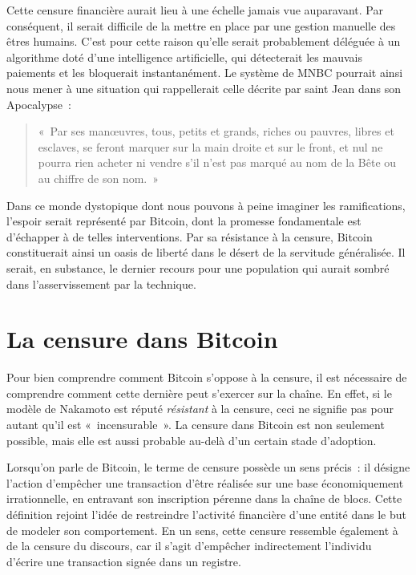 Cette censure financière aurait lieu à une échelle jamais vue auparavant. Par conséquent, il serait difficile de la mettre en place par une gestion manuelle des êtres humains. C'est pour cette raison qu'elle serait probablement déléguée à un algorithme doté d'une intelligence artificielle, qui détecterait les mauvais paiements et les bloquerait instantanément. Le système de MNBC pourrait ainsi nous mener à une situation qui rappellerait celle décrite par saint Jean dans son Apocalypse~:

\begin{quote}
«~Par ses manœuvres, tous, petits et grands, riches ou pauvres, libres et esclaves, se feront marquer sur la main droite et sur le front, et nul ne pourra rien acheter ni vendre s'il n'est pas marqué au nom de la Bête ou au chiffre de son nom.~»
\end{quote}

Dans ce monde dystopique dont nous pouvons à peine imaginer les ramifications, l'espoir serait représenté par Bitcoin, dont la promesse fondamentale est d'échapper à de telles interventions. Par sa résistance à la censure, Bitcoin constituerait ainsi un oasis de liberté dans le désert de la servitude généralisée. Il serait, en substance, le dernier recours pour une population qui aurait sombré dans l'asservissement par la technique.

\section*{La censure dans Bitcoin}

Pour bien comprendre comment Bitcoin s'oppose à la censure, il est nécessaire de comprendre comment cette dernière peut s'exercer sur la chaîne. En effet, si le modèle de Nakamoto est réputé \emph{résistant} à la censure, ceci ne signifie pas pour autant qu'il est «~incensurable~». La censure dans Bitcoin est non seulement possible, mais elle est aussi probable au-delà d'un certain stade d'adoption.

Lorsqu'on parle de Bitcoin, le terme de censure possède un sens précis~: il désigne l'action d'empêcher une transaction d'être réalisée sur une base économiquement irrationnelle, en entravant son inscription pérenne dans la chaîne de blocs. Cette définition rejoint l'idée de restreindre l'activité financière d'une entité dans le but de modeler son comportement. En un sens, cette censure ressemble également à de la censure du discours, car il s'agit d'empêcher indirectement l'individu d'écrire une transaction signée dans un registre. %

